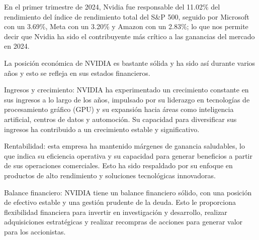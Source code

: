 \documentclass[twocolumn, 12pt]{article}
\begin{document}
En el primer trimestre de 2024, Nvidia fue responsable del
11.02\% del rendimiento del índice de rendimiento total
del S\&P 500, seguido por Microsoft con un 3.69\%, Meta
con un 3.20\% y Amazon con un 2.83\%; lo que nos permite
decir que Nvidia ha sido el contribuyente más crítico a las
ganancias del mercado en 2024.

La posición económica de NVIDIA es bastante sólida y ha sido
así durante varios años y esto se refleja en sus estados financieros.

Ingresos y crecimiento: NVIDIA ha experimentado un crecimiento
constante en sus ingresos a lo largo de los años, impulsado por
su liderazgo en tecnologías de procesamiento gráfico (GPU) y
su expansión hacia áreas como inteligencia artificial, centros
de datos y automoción. Su capacidad para diversificar sus ingresos
ha contribuido a un crecimiento estable y significativo.

Rentabilidad: esta empresa ha mantenido márgenes de ganancia
saludables, lo que indica su eficiencia operativa y su capacidad
para generar beneficios a partir de sus operaciones comerciales.
Esto ha sido respaldado por su enfoque en productos de alto
rendimiento y soluciones tecnológicas innovadoras.

Balance financiero: NVIDIA tiene un balance financiero sólido,
con una posición de efectivo estable y una gestión prudente de
la deuda. Esto le proporciona flexibilidad financiera para
invertir en investigación y desarrollo, realizar adquisiciones
estratégicas y realizar recompras de acciones para generar valor
para los accionistas.
\end{document}
